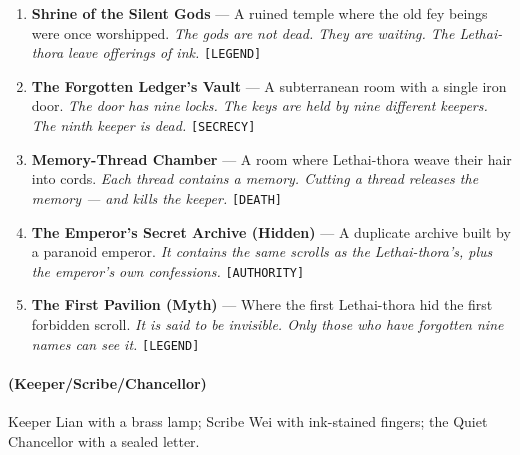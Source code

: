 \begin{enumerate}
  \hfill \textit{The river carries the secrets to the sea. The sea does not tell.} \texttt{[RITUAL]}
\item \textbf{Shrine of the Silent Gods} --- A ruined temple where the old fey beings were once worshipped.
  \hfill \textit{The gods are not dead. They are waiting. The Lethai-thora leave offerings of ink.} \texttt{[LEGEND]}
\item[J] \textbf{The Forgotten Ledger's Vault} --- A subterranean room with a single iron door.
  \hfill \textit{The door has nine locks. The keys are held by nine different keepers. The ninth keeper is dead.} \texttt{[SECRECY]}
\item[Q] \textbf{Memory-Thread Chamber} --- A room where Lethai-thora weave their hair into cords.
  \hfill \textit{Each thread contains a memory. Cutting a thread releases the memory --- and kills the keeper.} \texttt{[DEATH]}
\item[K] \textbf{The Emperor's Secret Archive (Hidden)} --- A duplicate archive built by a paranoid emperor.
  \hfill \textit{It contains the same scrolls as the Lethai-thora's, plus the emperor's own confessions.} \texttt{[AUTHORITY]}
\item[A] \textbf{The First Pavilion (Myth)} --- Where the first Lethai-thora hid the first forbidden scroll.
  \hfill \textit{It is said to be invisible. Only those who have forgotten nine names can see it.} \texttt{[LEGEND]}
\end{enumerate}

\paragraph*{(Keeper/Scribe/Chancellor)} Keeper Lian with a brass lamp; Scribe Wei with ink-stained fingers; the Quiet Chancellor with a sealed letter.

